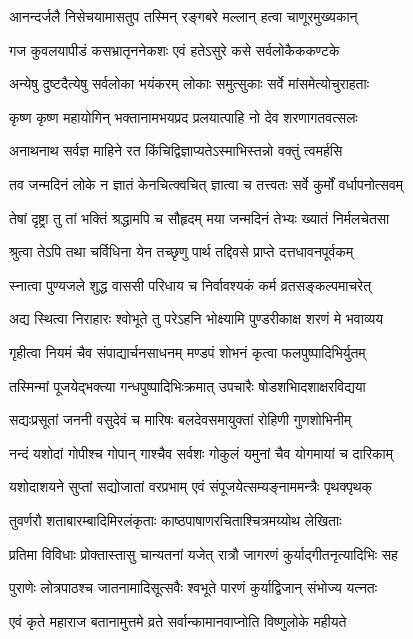 \twolineshloka
{आनन्दर्जलै निसेचयामासतुप}
{तस्मिन् रङ्गबरे मल्लान् हत्वा चाणूरमुख्यकान्}%

\twolineshloka
{गज कुवलयापीडं कसभ्रातृननेकशः}
{एवं हतेऽसुरे कसे सर्वलोकैककण्टके}%

\twolineshloka
{अन्येषु दुष्टदैत्येषु सर्वलोका भयंकरम्}
{लोकाः समुत्सुकाः सर्वे मांसमेत्योचुराहताः}%

\twolineshloka
{कृष्ण कृष्ण महायोगिन् भक्तानामभयप्रद}
{प्रलयात्पाहि नो देव शरणागतवत्सलः}%

\twolineshloka
{अनाथनाथ सर्वज्ञ माहिने रत}
{किंचिद्विज्ञाप्यतेऽस्माभिस्तन्नो वक्तुं त्वमर्हसि}%

\twolineshloka
{तव जन्मदिनं लोके न ज्ञातं केनचित्क्वचित्}
{ज्ञात्वा च तत्त्वतः सर्वे कुर्मों वर्धापनोत्सवम्}%

\twolineshloka
{तेषां दृष्ट्रा तु तां भक्तिं श्रद्धामपि च सौहृदम्}
{मया जन्मदिनं तेभ्यः ख्यातं निर्मलचेतसा}%

\twolineshloka
{श्रुत्वा तेऽपि तथा चर्विधिना येन तच्छृणु}
{पार्थ तद्दिवसे प्राप्ते दत्तधावनपूर्वकम्}%

\twolineshloka
{स्नात्वा पुण्यजले शुद्ध वाससी परिधाय च}
{निर्वावश्यकं कर्म व्रतसङ्कल्पमाचरेत्}%

\twolineshloka
{अद्य स्थित्वा निराहारः श्वोभूते तु परेऽहनि}
{भोक्ष्यामि पुण्डरीकाक्ष शरणं मे भवाव्यय}%

\twolineshloka
{गृहीत्वा नियमं चैव संपाद्यार्चनसाधनम्}
{मण्डपं शोभनं कृत्वा फलपुष्पादिभिर्युतम्}%

\twolineshloka
{तस्मिन्मां पूजयेद्भक्त्या गन्धपुष्पादिभिःक्रमात्}
{उपचारैः षोडशभिादशाक्षरविद्यया}%

\twolineshloka
{सद्यःप्रसूतां जननी वसुदेवं च मारिषः}
{बलदेवसमायुक्तां रोहिणी गुणशोभिनीम्}%

\twolineshloka
{नन्दं यशोदां गोपीश्च गोपान् गाश्चैव सर्वशः}
{गोकुलं यमुनां चैव योगमायां च दारिकाम्}%

\twolineshloka
{यशोदाशयने सुप्तां सद्योजातां वरप्रभाम्}
{एवं संपूजयेत्सम्यङ्नाममन्त्रैः पृथक्पृथक्}%

\twolineshloka
{तुवर्णरौ शताबारम्बादिमिरलंकृताः}
{काष्ठपाषाणरचिताश्चित्रमय्योथ लेखिताः}%

\twolineshloka
{प्रतिमा विविधाः प्रोक्तास्तासु चान्यतनां यजेत्}
{रात्रौ जागरणं कुर्याद्गीतनृत्यादिभिः सह}%

\twolineshloka
{पुराणेः लोत्रपाठश्च जातनामादिसूत्सवैः}
{श्वभूते पारणं कुर्याद्विजान् संभोज्य यत्नतः}%

\twolineshloka
{एवं कृते महाराज बतानामुत्तमे व्रते}
{सर्वान्कामानवाप्नोति विष्णुलोके महीयते}%

